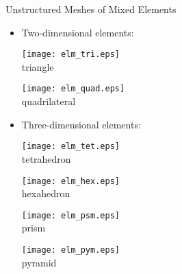 \documentclass[dvips,xcolor=pst,14pt]{beamer}
\begin{document}
\begin{frame}{
%
Unstructured Meshes of Mixed Elements
%
}
\begin{itemize}
  \item Two-dimensional elements:
  \begin{center}
    \parbox{0.2\textwidth}{\centering
    \texttt{[image: elm\_tri.eps]} \\ \footnotesize
    triangle}
    \parbox{0.2\textwidth}{\centering 
    \texttt{[image: elm\_quad.eps]} \\ \footnotesize
    quadrilateral}
  \end{center}
  \item Three-dimensional elements:
  \begin{center}
    \parbox{0.2\textwidth}{\centering
    \texttt{[image: elm\_tet.eps]} \\ \footnotesize
    tetrahedron}
    \parbox{0.2\textwidth}{\centering
    \texttt{[image: elm\_hex.eps]} \\ \footnotesize
    hexahedron}
    \parbox{0.2\textwidth}{\centering
    \texttt{[image: elm\_psm.eps]} \\ \footnotesize
    prism}
    \parbox{0.2\textwidth}{\centering
    \texttt{[image: elm\_pym.eps]} \\ \footnotesize
    pyramid}
  \end{center}
\end{itemize}
\end{frame}
\end{document}
